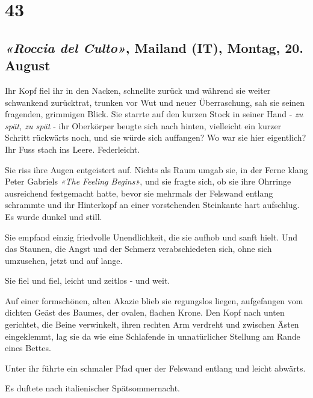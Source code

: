 \chapter{43}

\section[«Roccia del Culto», Mailand (IT), Montag, 20. August]{\emph{«Roccia del Culto»}, Mailand (IT), Montag, 20. August}

Ihr Kopf fiel ihr in den Nacken, schnellte zurück und während sie weiter
schwankend zurücktrat, trunken vor Wut und neuer Überraschung, sah sie
seinen fragenden, grimmigen Blick. Sie starrte auf den kurzen Stock in
seiner Hand - \emph{zu spät, zu spät} - ihr Oberkörper beugte sich nach
hinten, vielleicht ein kurzer Schritt rückwärts noch, und sie würde sich
auffangen? Wo war sie hier eigentlich? Ihr Fuss stach ins Leere.
Federleicht.

Sie riss ihre Augen entgeistert auf. Nichts als Raum umgab sie, in der
Ferne klang Peter Gabriels \emph{«The Feeling Begins»}, und sie fragte
sich, ob sie ihre Ohrringe ausreichend festgemacht hatte, bevor sie
mehrmals der Felswand entlang schrammte und ihr Hinterkopf an einer
vorstehenden Steinkante hart aufschlug. Es wurde dunkel und still.


Sie empfand einzig friedvolle Unendlichkeit, die sie aufhob und sanft
hielt. Und das Staunen, die Angst und der Schmerz 
verabschiedeten sich, ohne sich umzusehen, jetzt und auf
lange.

\sectionbreak

Sie fiel und fiel, leicht und zeitlos - und weit.

\sectionbreak

Auf einer formschönen, alten Akazie blieb sie regungslos liegen,
aufgefangen vom dichten Geäst des Baumes, der ovalen, flachen Krone. Den
Kopf nach unten gerichtet, die Beine verwinkelt, ihren rechten Arm
verdreht und zwischen Ästen eingeklemmt, lag sie da wie eine Schlafende in 
unnatürlicher Stellung am Rande eines Bettes.

\sectionbreak

Unter ihr führte ein schmaler Pfad quer der Felswand entlang und leicht
abwärts.

Es duftete nach italienischer Spätsommernacht.
